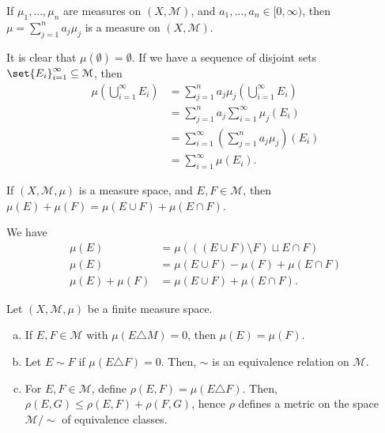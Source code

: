 \documentclass[10pt]{mypackage}
\begin{document}
\begin{exercise}[Exercise 7]
  If $\mu_1,\dots,\mu_n$ are measures on $\left(X,\mathcal{M}\right)$, and $a_1,\dots,a_n\in [0,\infty)$, then $\mu = \sum_{j=1}^{n}a_j\mu_j$ is a measure on $\left(X,\mathcal{M}\right)$.
\end{exercise}
\begin{solution}
  It is clear that $\mu\left(\emptyset\right) = \emptyset$. If we have a sequence of disjoint sets $\set{E_i}_{i=1}^{\infty}\subseteq \mathcal{M}$, then
  \begin{align*}
    \mu\left(\bigcup_{i=1}^{\infty}E_i\right) &= \sum_{j=1}^{n}a_j\mu_j\left(\bigcup_{i=1}^{\infty}E_i\right)\\
                                              &= \sum_{j=1}^{n}a_j\sum_{i=1}^{\infty}\mu_j\left(E_i\right)\\
                                              &= \sum_{i=1}^{\infty}\left(\sum_{j=1}^{n}a_j\mu_j\right)\left(E_i\right)\\
                                              &= \sum_{i=1}^{\infty}\mu\left(E_i\right).
  \end{align*}
  
\end{solution}
\begin{exercise}[Exercise 9]
  If $\left(X,\mathcal{M},\mu\right)$ is a measure space, and $E,F\in \mathcal{M}$, then $\mu\left(E\right) + \mu\left(F\right) = \mu\left(E\cup F\right) + \mu\left(E\cap F\right)$.
\end{exercise}
\begin{solution}
  We have
  \begin{align*}
    \mu\left(E\right) &= \mu\left(\left(\left(E\cup F\right)\setminus F\right)\sqcup E\cap F\right)\\
    \mu\left(E\right) &= \mu\left(E\cup F\right) - \mu\left(F\right) + \mu\left(E\cap F\right)\\
    \mu\left(E\right) + \mu\left(F\right) &= \mu\left(E\cup F\right) + \mu\left(E\cap F\right).
  \end{align*}
\end{solution}
\begin{exercise}[Exercise 12]
Let $\left(X,\mathcal{M},\mu\right)$ be a finite measure space.
\begin{enumerate}[(a)]
  \item If $E,F\in \mathcal{M}$ with $\mu\left(E\triangle M\right) = 0$, then $\mu\left(E\right) = \mu\left(F\right)$.
  \item Let $E\sim F$ if $\mu\left(E\triangle F\right) = 0$. Then, $\sim$ is an equivalence relation on $\mathcal{M}$.
  \item For $E,F\in \mathcal{M}$, define $\rho\left(E,F\right) = \mu\left(E\triangle F\right)$. Then, $\rho\left(E,G\right)\leq \rho\left(E,F\right) + \rho\left(F,G\right)$, hence $\rho$ defines a metric on the space $\mathcal{M}/\sim$ of equivalence classes.
\end{enumerate}
\end{exercise}
\end{document}
